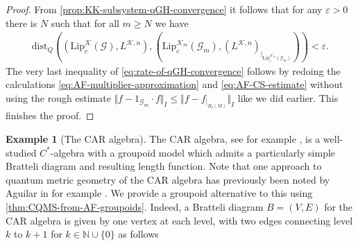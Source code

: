 \documentclass[11pt,a4paper,oneside,final,reqno]{amsart}
\theoremstyle{definition}
\newtheorem{example}[lemma]{Example}
\newcommand{\G}{\mathcal{G}}
\newcommand{\cK}{\mathcal{K}}
\newcommand{\Lip}{\mathrm{Lip}}
\newcommand{\N}{\mathbb{N}}
\numberwithin{equation}{section}
\begin{document}
\begin{proof}
		From \cref{prop:KK-subsystem-qGH-convergence} it follows that for any $\varepsilon > 0$ there is $N$ such that for all $m \geq N$ we have
		\begin{align*}
			\mathrm{dist}_Q (( \Lip_c^{\cK}(\G), L^{\cK, n}), (\Lip_c^{\cK_m}(\G_m),(L^{\cK, n})_{\vert_{\Lip_c^{\cK_m}(\G_m)}})) <  \varepsilon.
		\end{align*}
		The very last inequality of \eqref{eq:rate-of-qGH-convergence} follows by redoing the calculations \eqref{eq:AF-multiplier-approximation} and \eqref{eq:AF-CS-estimate} without using the rough estimate $\Vert f - 1_{\G_m} \cdot f \Vert_I \leq \Vert f - f_{\vert_{B_\ell(M)}} \Vert_I$ like we did earlier. This finishes the proof. 


	\end{proof}
	
	\begin{example}[The CAR algebra]
		The CAR algebra, see for example \cite[Example III.5.4]{DavidsonBook1996}, is a well-studied $C^*$-algebra with a groupoid model which admits a particularly simple Bratteli diagram and resulting length function. Note that one approach to quantum metric geometry of the CAR algebra has previously been noted by Aguilar in for example \cite[Example 2.4]{AguilarIndLim2021}. We provide a groupoid alternative to this using \cref{thm:CQMS-from-AF-groupoids}. Indeed, a Bratteli diagram $B=(V,E)$ for the CAR algebra is given by one vertex at each level, with two edges connecting level $k$ to $k+1$ for $k \in \N\cup\{0\}$ as follows
		

\end{example}
\end{document}
